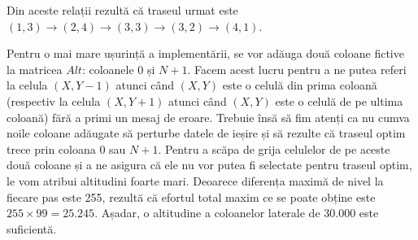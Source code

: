 Din aceste relații rezultă că traseul urmat este $(1,3) \to (2,4) \to (3,3)
\to (3,2) \to (4,1)$.

Pentru o mai mare ușurință a implementării, se vor adăuga două coloane fictive
la matricea $Alt$: coloanele 0 și $N + 1$. Facem acest lucru pentru a ne putea
referi la celula $(X,Y-1)$ atunci când $(X, Y)$ este o celulă din prima
coloană (respectiv la celula $(X,Y+1)$ atunci când $(X,Y)$ este o celulă de pe
ultima coloană) fără a primi un mesaj de eroare. Trebuie însă să fim atenți ca
nu cumva noile coloane adăugate să perturbe datele de ieșire și să rezulte că
traseul optim trece prin coloana 0 sau $N+1$. Pentru a scăpa de grija
celulelor de pe aceste două coloane și a ne asigura că ele nu vor putea fi
selectate pentru traseul optim, le vom atribui altitudini foarte
mari. Deoarece diferența maximă de nivel la fiecare pas este 255, rezultă că
efortul total maxim ce se poate obține este $255 \times 99 = 25.245$. Așadar,
o altitudine a coloanelor laterale de 30.000 este suficientă.

\inputminted{c}{src/problem5.c}
